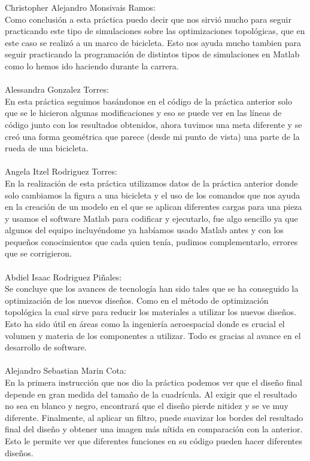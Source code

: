 \documentclass{article}
\begin{document}
Christopher Alejandro Monsivais Ramos: 
\\Como conclusión a esta práctica puedo decir que nos sirvió mucho para seguir practicando este tipo de simulaciones sobre las optimizaciones topológicas, que en este caso se realizó a un marco de bicicleta. Esto nos ayuda mucho tambien para seguir practicando la programación de distintos tipos de simulaciones en Matlab como lo hemos ido haciendo durante la carrera.
\\
\\
Alessandra Gonzalez Torres: 
\\En esta práctica seguimos basándonos en el código de la práctica anterior solo que se le hicieron algunas modificaciones y  eso se puede ver en las líneas de código junto con los resultados obtenidos, ahora tuvimos una meta diferente y se creó una forma geométrica que parece (desde mi punto de vista) una parte de la rueda de una bicicleta.
\\
\\
Angela Itzel Rodriguez Torres: 
\\En la realización de esta práctica utilizamos datos de la práctica anterior donde solo cambiamos la figura a una bicicleta y el uso de los comandos que nos ayuda en la creación de un modelo en el que se aplican diferentes cargas para una pieza y usamos el software Matlab para codificar y ejecutarlo, fue algo sencillo ya que algunos del equipo incluyéndome ya habíamos usado Matlab antes y con los pequeños conocimientos que cada quien tenía, pudimos complementarlo, errores que se corrigieron.
\\
\\
Abdiel Isaac Rodriguez Piñales: 
\\Se concluye que los avances de tecnología han sido tales que se ha conseguido la optimización de los nuevos diseños. Como en el método de optimización topológica la cual sirve para reducir los materiales a utilizar los nuevos diseños. Esto ha sido útil en áreas como la ingeniería aeroespacial donde es crucial el volumen y materia de los componentes a utilizar. Todo es gracias al avance en el desarrollo de software.
\\
\\
Alejandro Sebastian Marin Cota: 
\\En la primera instrucción que nos dio la práctica podemos ver que el diseño final depende en gran medida del tamaño de la cuadrícula. Al exigir que el resultado no sea en blanco y negro, encontrará que el diseño pierde nitidez y se ve muy diferente. Finalmente, al aplicar un filtro, puede suavizar los bordes del resultado final del diseño y obtener una imagen más nítida en comparación con la anterior. Esto le permite ver que diferentes funciones en su código pueden hacer diferentes diseños.
\end{document}
